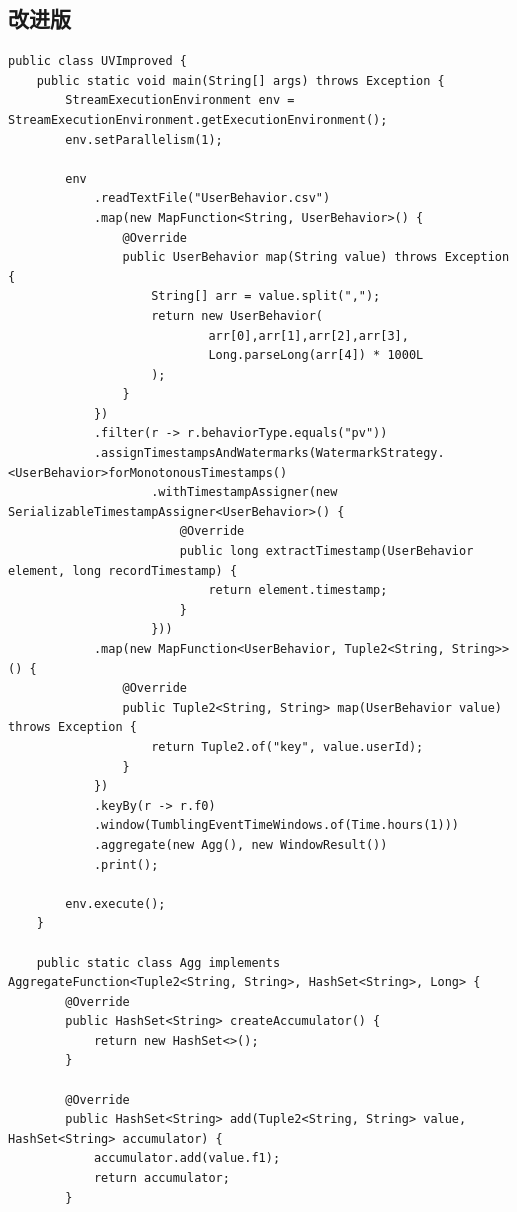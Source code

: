 \documentclass[cn,11pt,chinese]{elegantbook}
\begin{document}
\subsection{改进版}

\begin{verbatim}
public class UVImproved {
    public static void main(String[] args) throws Exception {
        StreamExecutionEnvironment env = StreamExecutionEnvironment.getExecutionEnvironment();
        env.setParallelism(1);

        env
            .readTextFile("UserBehavior.csv")
            .map(new MapFunction<String, UserBehavior>() {
                @Override
                public UserBehavior map(String value) throws Exception {
                    String[] arr = value.split(",");
                    return new UserBehavior(
                            arr[0],arr[1],arr[2],arr[3],
                            Long.parseLong(arr[4]) * 1000L
                    );
                }
            })
            .filter(r -> r.behaviorType.equals("pv"))
            .assignTimestampsAndWatermarks(WatermarkStrategy.<UserBehavior>forMonotonousTimestamps()
                    .withTimestampAssigner(new SerializableTimestampAssigner<UserBehavior>() {
                        @Override
                        public long extractTimestamp(UserBehavior element, long recordTimestamp) {
                            return element.timestamp;
                        }
                    }))
            .map(new MapFunction<UserBehavior, Tuple2<String, String>>() {
                @Override
                public Tuple2<String, String> map(UserBehavior value) throws Exception {
                    return Tuple2.of("key", value.userId);
                }
            })
            .keyBy(r -> r.f0)
            .window(TumblingEventTimeWindows.of(Time.hours(1)))
            .aggregate(new Agg(), new WindowResult())
            .print();

        env.execute();
    }

    public static class Agg implements AggregateFunction<Tuple2<String, String>, HashSet<String>, Long> {
        @Override
        public HashSet<String> createAccumulator() {
            return new HashSet<>();
        }

        @Override
        public HashSet<String> add(Tuple2<String, String> value, HashSet<String> accumulator) {
            accumulator.add(value.f1);
            return accumulator;
        }


\end{verbatim}
\end{document}
